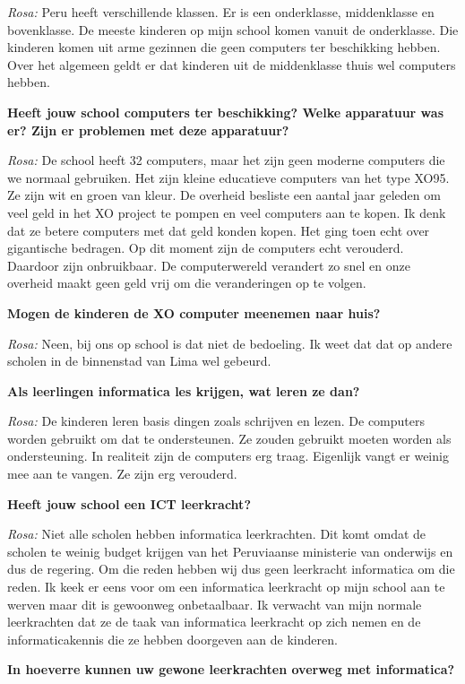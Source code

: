 \textit{Rosa:} Peru heeft verschillende klassen. Er is een onderklasse, middenklasse en bovenklasse. De meeste kinderen op mijn school komen vanuit de onderklasse. Die kinderen komen uit arme gezinnen die geen computers ter beschikking hebben. Over het algemeen geldt er dat kinderen uit de middenklasse thuis wel computers hebben.

\textbf{Heeft jouw school computers ter beschikking? Welke apparatuur was er? Zijn er problemen met deze apparatuur?}

\textit{Rosa:} De school heeft 32 computers, maar het zijn geen moderne computers die we normaal gebruiken. Het zijn kleine educatieve computers van het type XO95. Ze zijn wit en groen van kleur. De overheid besliste een aantal jaar geleden om veel geld in het XO project te pompen en veel computers aan te kopen. Ik denk dat ze betere computers met dat geld konden kopen. Het ging toen echt over gigantische bedragen. Op dit moment zijn de computers echt verouderd. Daardoor zijn onbruikbaar. De computerwereld verandert zo snel en onze overheid maakt geen geld vrij om die veranderingen op te volgen.

\textbf{Mogen de kinderen de XO computer meenemen naar huis?}

\textit{Rosa:} Neen, bij ons op school is dat niet de bedoeling. Ik weet dat dat op andere scholen in de binnenstad van Lima wel gebeurd.

\textbf{Als leerlingen informatica les krijgen, wat leren ze dan?}

\textit{Rosa:} De kinderen leren basis dingen zoals schrijven en lezen. De computers worden gebruikt om dat te ondersteunen. Ze zouden gebruikt moeten worden als ondersteuning. In realiteit zijn de computers erg traag. Eigenlijk vangt er weinig mee aan te vangen. Ze zijn erg verouderd.

\textbf{Heeft jouw school een ICT leerkracht?}

\textit{Rosa:} Niet alle scholen hebben informatica leerkrachten. Dit komt omdat de scholen te weinig budget krijgen van het Peruviaanse ministerie van onderwijs en dus de regering. Om die reden hebben wij dus geen leerkracht informatica om die reden. Ik keek er eens voor om een informatica leerkracht op mijn school aan te werven maar dit is gewoonweg onbetaalbaar. Ik verwacht van mijn normale leerkrachten dat ze de taak van informatica leerkracht op zich nemen en de informaticakennis die ze hebben doorgeven aan de kinderen.

\textbf{In hoeverre kunnen uw gewone leerkrachten overweg met informatica?}

